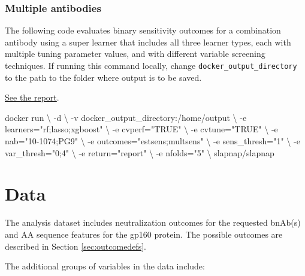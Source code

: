 \documentclass[]{article}
\newenvironment{Shaded}{\begin{snugshade}}{\end{snugshade}}
\newcommand{\StringTok}[1]{\textcolor[rgb]{0.31,0.60,0.02}{#1}}
\newcommand{\ExtensionTok}[1]{#1}
\newcommand{\NormalTok}[1]{#1}
\begin{document}
\subsubsection{Multiple antibodies}\label{multiple-antibodies}

The following code evaluates binary sensitivity outcomes for a
combination antibody using a super learner that includes all three
learner types, each with multiple tuning parameter values, and with
different variable screening techniques. If running this command
locally, change \texttt{docker\_output\_directory} to the path to the
folder where output is to be saved.

\href{reports/report_10-1074_pg9.html}{See the report}.

\begin{Shaded}
\begin{Highlighting}[]
\ExtensionTok{docker}\NormalTok{ run \textbackslash{}}
\NormalTok{  -d \textbackslash{}}
\NormalTok{  -v docker_output_directory:/home/output \textbackslash{}}
\NormalTok{  -e learners=}\StringTok{"rf;lasso;xgboost"}\NormalTok{ \textbackslash{}}
\NormalTok{  -e cvperf=}\StringTok{"TRUE"}\NormalTok{ \textbackslash{}}
\NormalTok{  -e cvtune=}\StringTok{"TRUE"}\NormalTok{ \textbackslash{}}
\NormalTok{  -e nab=}\StringTok{"10-1074;PG9"}\NormalTok{ \textbackslash{}}
\NormalTok{  -e outcomes=}\StringTok{"estsens;multsens"}\NormalTok{ \textbackslash{}}
\NormalTok{  -e sens_thresh=}\StringTok{"1"}\NormalTok{ \textbackslash{}}
\NormalTok{  -e var_thresh=}\StringTok{"0;4"}\NormalTok{ \textbackslash{}}
\NormalTok{  -e return=}\StringTok{"report"}\NormalTok{ \textbackslash{}}
\NormalTok{  -e nfolds=}\StringTok{"5"}\NormalTok{ \textbackslash{}}
\NormalTok{  slapnap/slapnap}
\end{Highlighting}
\end{Shaded}

\section{Data}\label{sec:data}

The analysis dataset includes neutralization outcomes for the requested
bnAb(s) and AA sequence features for the gp160 protein. The possible
outcomes are described in Section \ref{sec:outcomedefs}.

The additional groups of variables in the data include:
\end{document}
